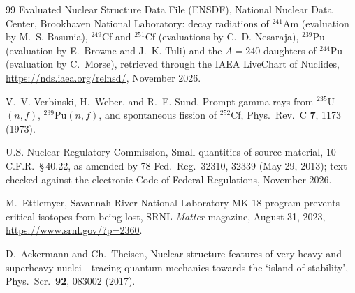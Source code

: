 \documentclass[aps,prd,onecolumn,superscriptaddress,floatfix,nofootinbib]{revtex4-2}
\newcommand{\Pu}[1]{$^{#1}$Pu}
\newcommand{\nuc}[2]{$^{#1}$#2}
\begin{document}
\begin{thebibliography}{99}
Evaluated Nuclear Structure Data File (ENSDF), National Nuclear Data Center, Brookhaven National Laboratory:
decay radiations of \nuc{241}{Am} (evaluation by M.~S. Basunia), \nuc{249}{Cf} and \nuc{251}{Cf} (evaluations by
C.~D. Nesaraja), \Pu{239} (evaluation by E.~Browne and J.~K. Tuli) and the $A=240$ daughters of \Pu{244}
(evaluation by C.~Morse), retrieved through the IAEA
LiveChart of Nuclides, \url{https://nds.iaea.org/relnsd/}, November 2026.

V.~V. Verbinski, H.~Weber, and R.~E. Sund,
Prompt gamma rays from $^{235}$U$(n,f)$, $^{239}$Pu$(n,f)$, and spontaneous fission of $^{252}$Cf,
Phys.\ Rev.\ C \textbf{7}, 1173 (1973).

U.S. Nuclear Regulatory Commission, Small quantities of source material, 10 C.F.R.\ \S\,40.22, as amended by
78 Fed.\ Reg.\ 32310, 32339 (May 29, 2013); text checked against the electronic Code of Federal Regulations,
November 2026.

M.~Ettlemyer, Savannah River National Laboratory MK-18 program prevents critical isotopes from being lost,
SRNL \textit{Matter} magazine, August 31, 2023,
\url{https://www.srnl.gov/?p=2360}.

D.~Ackermann and Ch.~Theisen,
Nuclear structure features of very heavy and superheavy nuclei---tracing quantum mechanics towards the
`island of stability',
Phys.\ Scr.\ \textbf{92}, 083002 (2017).

\end{thebibliography}
\end{document}
